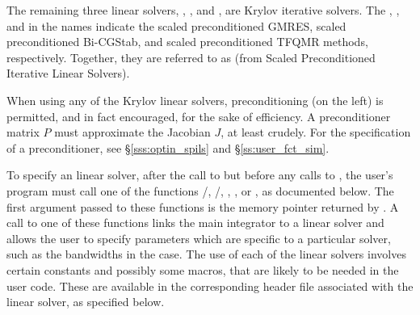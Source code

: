 The remaining three {\ida} linear solvers, {\idaspgmr}, {\idaspbcg},
and {\idasptfqmr}, are Krylov iterative solvers. The {\spgmr}, {\spbcg}, and
{\sptfqmr} in the names indicate the scaled preconditioned GMRES, scaled
preconditioned Bi-CGStab, and scaled preconditioned TFQMR methods, respectively.
Together, they are referred to as {\idaspils} (from Scaled Preconditioned 
Iterative Linear Solvers).

When using any of the Krylov linear solvers, preconditioning (on the left)
is permitted, and in fact encouraged, for the sake of efficiency.
A preconditioner matrix $P$ must approximate the Jacobian $J$, at least
crudely.  For the specification of a preconditioner, see \S\ref{sss:optin_spils}
and \S\ref{ss:user_fct_sim}.

To specify an {\ida} linear solver, after the call to  but
before any calls to , the user's program must call one of the
functions /, /,
, , or , as documented below.
The first argument passed to these functions
is the {\ida} memory pointer returned by .  A call to one of these
functions links the main {\ida} integrator to a linear solver and
allows the user to specify parameters which are specific to a
particular solver, such as the bandwidths in the {\idaband} case.
The use of each of the linear solvers involves certain constants and possibly 
some macros, that are likely to be needed in the user code.  These are
available in the corresponding header file associated with the linear
solver, as specified below.

